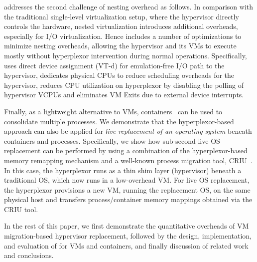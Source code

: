 \arch addresses the second challenge of nesting overhead as follows.
In comparison with the traditional single-level virtualization setup, 
where the hypervisor directly controls the hardware,
nested virtualization introduces additional overheads,
especially for I/O virtualization.  Hence \arch includes a number 
of optimizations to minimize nesting overheads,
allowing the hypervisor and 
its VMs to execute mostly without hyperplexor intervention during 
normal operations.  Specifically, \arch uses direct device 
assignment (VT-d) for emulation-free I/O path to the hypervisor, 
dedicates physical CPUs to reduce scheduling overheads for the hypervisor,
reduces CPU utilization on hyperplexor by disabling the polling of hypervisor VCPUs and eliminates VM Exits due to %
external device interrupts.


Finally, as a lightweight alternative to VMs,
containers~\cite{gcpkubernetes, azureks, ibmkubernetes, vmwarepks}
can be used to consolidate multiple processes.
We demonstrate that the hyperplexor-based approach 
can also be applied for {\em live replacement of an operating system}
beneath containers and processes. 
Specifically, we show how sub-second live OS replacement can be performed
by using a combination of the hyperplexor-based memory remapping mechanism 
and a well-known process migration tool, CRIU~\cite{criu}.
In this case, the hyperplexor runs as a thin shim layer (hypervisor)
beneath a traditional OS, which now runs in a low-overhead VM. 
For live OS replacement, 
the hyperplexor provisions a new VM, running the replacement OS, on the same 
physical host and transfers process/container memory mappings 
obtained via the CRIU tool.

In the rest of this paper, we first demonstrate the quantitative overheads 
of VM migration-based hypervisor replacement, followed by the design, implementation, 
and evaluation of \arch for VMs and containers, and finally discussion of 
related work and conclusions.

